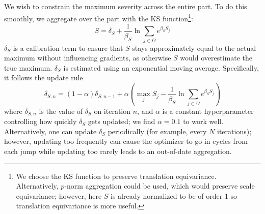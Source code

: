 \documentclass{article}
\begin{document}
We wish to constrain the maximum severity across the entire part. To do this smoothly, we aggregate over the part with the KS function\footnote{We choose the KS function to preserve translation equivariance. Alternatively, $p$-norm aggregation could be used, which would preserve scale equivariance; however, here $S$ is already normalized to be of order 1 so translation equivariance is more useful.}:
\[S = \delta_S + \frac{1}{\beta_S} \ln \sum_{j \in \Omega} e^{\beta_S S_j} \]
$\delta_S$ is a calibration term to ensure that $S$ stays approximately equal to the actual maximum without influencing gradients, as otherwise $S$ would overestimate the true maximum. $\delta_S$ is estimated using an exponential moving average.
Specifically, it follows the update rule
\[\delta_{S, n} = (1-\alpha) \delta_{S, n-1} + \alpha \left(\max_j S_j - \frac{1}{\beta_S} \ln \sum_{j \in \Omega} e^{\beta_S S_j}\right)\]
where $\delta_{S,n}$ is the value of $\delta_S$ on iteration $n$, and $\alpha$ is a constant hyperparameter controlling how quickly $\delta_S$ gets updated; we find $\alpha=0.1$ to work well. Alternatively, one can update $\delta_S$ periodically (for example, every $N$ iterations); however, updating too frequently can cause the optimizer to go in cycles from each jump while updating too rarely leads to an out-of-date aggregation.
\end{document}
